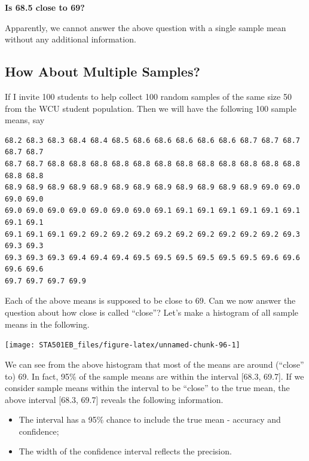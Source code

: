 \documentclass[
]{book}
\begin{document}
\textbf{Is 68.5 close to 69?}

Apparently, we {cannot } answer the above question with a{ single sample mean } without any additional information.

\hypertarget{how-about-multiple-samples}{%
\subsection{How About Multiple Samples?}\label{how-about-multiple-samples}}

If I invite 100 students to help collect 100 random samples of the same size 50 from the WCU student population. Then we will have the following 100 sample means, say

\begin{verbatim}
68.2 68.3 68.3 68.4 68.4 68.5 68.6 68.6 68.6 68.6 68.6 68.7 68.7 68.7 68.7 68.7 
68.7 68.7 68.8 68.8 68.8 68.8 68.8 68.8 68.8 68.8 68.8 68.8 68.8 68.8 68.8 68.8 
68.9 68.9 68.9 68.9 68.9 68.9 68.9 68.9 68.9 68.9 68.9 68.9 69.0 69.0 69.0 69.0 
69.0 69.0 69.0 69.0 69.0 69.0 69.0 69.1 69.1 69.1 69.1 69.1 69.1 69.1 69.1 69.1 
69.1 69.1 69.1 69.2 69.2 69.2 69.2 69.2 69.2 69.2 69.2 69.2 69.2 69.3 69.3 69.3 
69.3 69.3 69.3 69.4 69.4 69.4 69.5 69.5 69.5 69.5 69.5 69.5 69.6 69.6 69.6 69.6 
69.7 69.7 69.7 69.9
\end{verbatim}

Each of the above means is supposed to be close to 69. Can we now answer the question about how close is called ``close''? Let's make a histogram of all sample means in the following.

\begin{center}\texttt{[image: STA501EB\_files/figure-latex/unnamed-chunk-96-1]} \end{center}

We can see from the above histogram that most of the means are around (``close'' to) 69. In fact, 95\% of the sample means are within the interval {[}68.3, 69.7{]}. If we consider sample means within the interval to be { ``close'' }to the true mean, the above interval {[}68.3, 69.7{]} reveals the following information.

\begin{itemize}
\item
  The interval has a 95\% chance to include the true mean - accuracy and confidence;
\item
  The width of the confidence interval reflects the precision.
\end{itemize}
\end{document}

